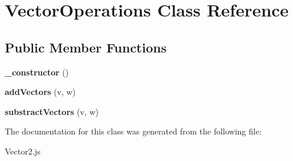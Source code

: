 \hypertarget{class_vector_operations}{}\section{Vector\+Operations Class Reference}
\label{class_vector_operations}
\subsection*{Public Member Functions}
\begin{DoxyCompactItemize}
\item 
\mbox{\label{class_vector_operations_ae63691225f6b17315880d628c2092cc6}} 
{\bfseries \+\_\+constructor} ()
\item 
\mbox{\label{class_vector_operations_a4439e29fb5a90df26d5b0f148c438306}} 
{\bfseries add\+Vectors} (v, w)
\item 
\mbox{\label{class_vector_operations_a28ae13c2f9054166320a32fb0513d769}} 
{\bfseries substract\+Vectors} (v, w)
\end{DoxyCompactItemize}


The documentation for this class was generated from the following file\+:\begin{DoxyCompactItemize}
\item 
Vector2.\+js\end{DoxyCompactItemize}
